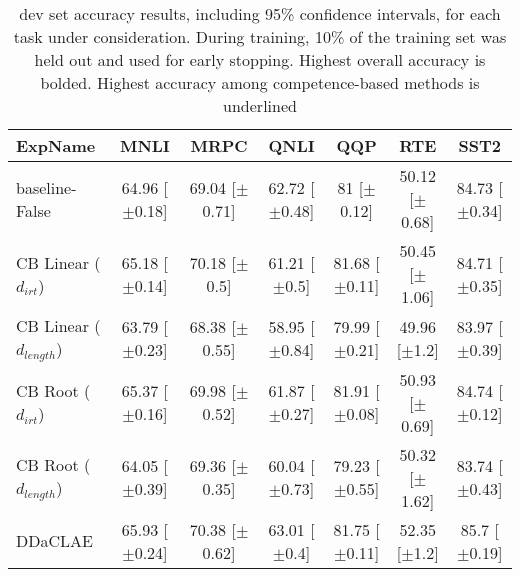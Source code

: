 \begin{table*}[ht]
\centering
\begingroup\small
\begin{tabular}{lcccccc}
  \toprule
ExpName & MNLI & MRPC & QNLI & QQP & RTE & SST2 \\ 
  \midrule
baseline-False & 64.96 [$\pm$0.18] & 69.04 [$\pm$0.71] & 62.72 [$\pm$0.48] & 81 [$\pm$0.12] & 50.12 [$\pm$0.68] & 84.73 [$\pm$0.34] \\ 
  CB Linear ($d_{irt}$) & 65.18 [$\pm$0.14] & 70.18 [$\pm$0.5] & 61.21 [$\pm$0.5] & 81.68 [$\pm$0.11] & 50.45 [$\pm$1.06] & 84.71 [$\pm$0.35] \\ 
  CB Linear ($d_{length}$) & 63.79 [$\pm$0.23] & 68.38 [$\pm$0.55] & 58.95 [$\pm$0.84] & 79.99 [$\pm$0.21] & 49.96 [$\pm$1.2] & 83.97 [$\pm$0.39] \\ 
  CB Root ($d_{irt}$) & 65.37 [$\pm$0.16] & 69.98 [$\pm$0.52] & 61.87 [$\pm$0.27] & 81.91 [$\pm$0.08] & 50.93 [$\pm$0.69] & 84.74 [$\pm$0.12] \\ 
  CB Root ($d_{length}$) & 64.05 [$\pm$0.39] & 69.36 [$\pm$0.35] & 60.04 [$\pm$0.73] & 79.23 [$\pm$0.55] & 50.32 [$\pm$1.62] & 83.74 [$\pm$0.43] \\ 
  DDaCLAE & 65.93 [$\pm$0.24] & 70.38 [$\pm$0.62] & 63.01 [$\pm$0.4] & 81.75 [$\pm$0.11] & 52.35 [$\pm$1.2] & 85.7 [$\pm$0.19] \\ 
   \bottomrule
\end{tabular}
\endgroup
\caption{dev set accuracy results, including 95\% confidence intervals, for each task under consideration. During training, 10\% of the training set was held out and used for early stopping. Highest overall accuracy is bolded. Highest accuracy among competence-based methods is underlined} 
\label{tab:acc_lstm-True}
\end{table*}
